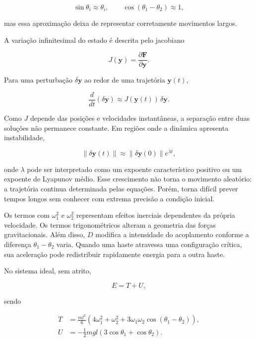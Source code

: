 \documentclass[12pt,a4paper]{article}
\begin{document}
\begin{equation}
\sin\theta_i\approx\theta_i,
\qquad
\cos(\theta_1-\theta_2)\approx1,
\end{equation}

mas essa aproximação deixa de representar corretamente movimentos largos.

A variação infinitesimal do estado é descrita pelo jacobiano

\begin{equation}
J(\mathbf{y})=\frac{\partial\mathbf{F}}{\partial\mathbf{y}}.
\end{equation}

Para uma perturbação $\delta\mathbf{y}$ ao redor de uma trajetória $\mathbf{y}(t)$,

\begin{equation}
\frac{d}{dt}(\delta\mathbf{y})
\approx J(\mathbf{y}(t))\,\delta\mathbf{y}.
\end{equation}

Como $J$ depende das posições e velocidades instantâneas, a separação entre duas soluções não permanece constante. Em regiões onde a dinâmica apresenta instabilidade,

\begin{equation}
\|\delta\mathbf{y}(t)\|
\approx
\|\delta\mathbf{y}(0)\|e^{\lambda t},
\end{equation}

onde $\lambda$ pode ser interpretado como um expoente característico positivo ou um expoente de Lyapunov médio. Esse crescimento não torna o movimento aleatório: a trajetória continua determinada pelas equações. Porém, torna difícil prever tempos longos sem conhecer com extrema precisão a condição inicial.

Os termos com $\omega_1^2$ e $\omega_2^2$ representam efeitos inerciais dependentes da própria velocidade. Os termos trigonométricos alteram a geometria das forças gravitacionais. Além disso, $D$ modifica a intensidade do acoplamento conforme a diferença $\theta_1-\theta_2$ varia. Quando uma haste atravessa uma configuração crítica, sua aceleração pode redistribuir rapidamente energia para a outra haste.

No sistema ideal, sem atrito,

\begin{equation}
E=T+U,
\end{equation}

sendo

\begin{align}
T&=\frac{ml^2}{6}\left(4\omega_1^2+\omega_2^2
+3\omega_1\omega_2\cos(\theta_1-\theta_2)\right),\\
U&=-\frac12mgl\left(3\cos\theta_1+\cos\theta_2\right).
\end{align}
\end{document}

